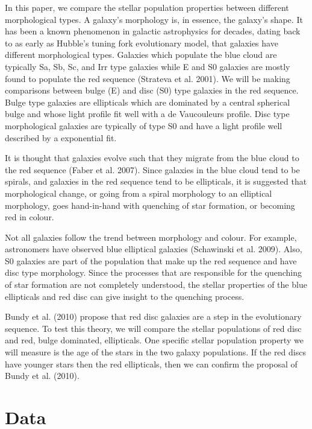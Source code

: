 \documentclass[showcase, preprintnumbers, amsmath, amssymb, bibnotes, 12pt]{revtex4}
\begin{document}
In this paper, we compare the stellar population properties between different morphological types. A galaxy's morphology is, in essence, the galaxy's shape. It has been a known phenomenon in galactic astrophysics for decades, dating back to as early as Hubble's tuning fork evolutionary model, that  galaxies have different morphological types. Galaxies which populate the blue cloud are typically Sa, Sb, Sc, and Irr type galaxies while E and S0 galaxies are mostly found to populate the red sequence (Strateva et al. 2001). We will be making comparisons between bulge (E) and disc (S0) type galaxies in the red sequence. Bulge type galaxies are ellipticals which are dominated by a central spherical bulge and whose light profile fit well with a de Vaucouleurs profile. %
 Disc type morphological galaxies are typically of type S0 and have a light profile well described by a exponential fit.%

It is thought that galaxies evolve such that they migrate from the blue cloud to the red sequence (Faber et al. 2007). Since galaxies in the blue cloud tend to be spirals, and galaxies in the red sequence tend to be ellipticals, it is suggested that morphological change, or going from a spiral morphology to an elliptical morphology, goes hand-in-hand with quenching of star formation, or becoming red in colour.

Not all galaxies follow the trend between morphology and colour. For example, astronomers have observed blue elliptical galaxies (Schawinski et al. 2009). Also, S0 galaxies are part of the population that make up the red sequence and have disc type morphology. Since the processes that are responsible for the quenching of star formation are not completely understood, the stellar properties of the blue ellipticals and red disc can give insight to the quenching process. 

Bundy et al. (2010) propose that red disc galaxies are a step in the evolutionary sequence. To test this theory, we will compare the stellar populations of red disc and red, bulge dominated, ellipticals. One specific stellar population property we will measure is the age of the stars in the two galaxy populations. If the red discs have younger stars then the red ellipticals, then we can confirm the proposal of Bundy et al. (2010).

\section{Data}
\end{document}
